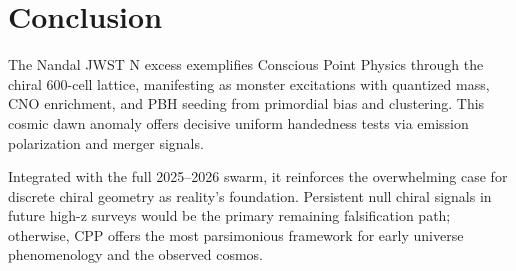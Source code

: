 \documentclass[11pt]{article}
\begin{document}
\section{Conclusion}
The Nandal JWST N excess exemplifies Conscious Point Physics through the chiral 600-cell lattice, manifesting as monster excitations with quantized mass, CNO enrichment, and PBH seeding from primordial bias and clustering. This cosmic dawn anomaly offers decisive uniform handedness tests via emission polarization and merger signals.  

Integrated with the full 2025--2026 swarm, it reinforces the overwhelming case for discrete chiral geometry as reality's foundation. Persistent null chiral signals in future high-z surveys would be the primary remaining falsification path; otherwise, CPP offers the most parsimonious framework for early universe phenomenology and the observed cosmos.
\end{document}
